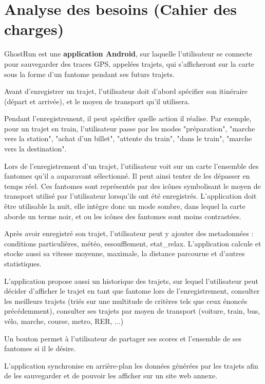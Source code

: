 \chapter{Analyse des besoins (Cahier des charges)}

GhostRun est une \textbf{application Android}, sur laquelle l'utilisateur se connecte pour sauvegarder des traces GPS, appelées trajets, qui s'afficheront sur la carte sous la forme d'un \gls{fantome} pendant ses futurs trajets.

Avant d'enregistrer un trajet, l'utilisateur doit d'abord spécifier son itinéraire (départ et arrivée), et le moyen de transport qu'il utilisera. 

Pendant l'enregistrement, il peut spécifier quelle action il réalise. Par exemple, pour un trajet en train, l'utilisateur passe par les modes "préparation", "marche vers la station", "achat d'un billet", "attente du train", "dans le train", "marche vers la destination".

Lors de l'enregistrement d'un trajet, l'utilisateur voit sur un carte l'ensemble des \glspl{fantome} qu'il a auparavant sélectionné. Il peut ainsi tenter de les dépasser en temps réel. Ces \glspl{fantome} sont représentés par des icônes symbolisant le moyen de transport utilisé par l'utilisateur lorsqu'ils ont été enregistrés. L'application doit être utilisable la nuit, elle intègre donc un mode sombre, dans lequel la carte aborde un terme noir, et ou les icônes des \glspl{fantome} sont moins contrastées.

Après avoir enregistré son trajet, l'utilisateur peut y ajouter des metadonnées : conditions particulières, météo, essoufflement, \gls{etat_relax}. L'application calcule et stocke aussi sa vitesse moyenne, maximale, la distance parcourue et d'autres statistiques.

L'application propose aussi un historique des trajets, sur lequel l'utilisateur peut décider d'afficher le trajet en tant que \gls{fantome} lors de l'enregistrement, consulter les meilleurs trajets (triés sur une multitude de critères tels que ceux énoncés précédemment), consulter ses trajets par moyen de transport (voiture, train, bus, vélo, marche, course, metro, RER, ...)

Un bouton permet à l'utilisateur de partager ses scores et l'ensemble de ses \glspl{fantome} si il le désire.

L'application synchronise en arrière-plan les données générées par les trajets afin de les sauvegarder et de pouvoir les afficher sur un site web annexe.

